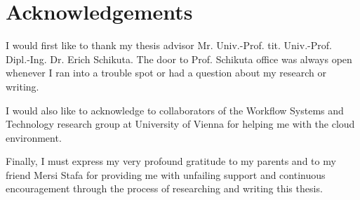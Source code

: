 
%

\thispagestyle{empty}

\section*{Acknowledgements}

I would first like to thank my thesis advisor Mr. Univ.-Prof. tit. Univ.-Prof. Dipl.-Ing. Dr. Erich Schikuta. The door to Prof. Schikuta office was always open whenever I ran into a trouble spot or had a question about my research or writing. 

I would also like to acknowledge to collaborators of the Workflow Systems and Technology research group at University of Vienna for helping me with the cloud environment. 

Finally, I must express my very profound gratitude to my parents and to my friend Mersi Stafa for providing me with unfailing support and continuous encouragement through the process of researching and writing this thesis. 


